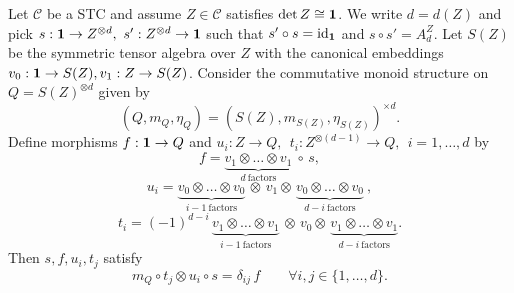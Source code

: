 \documentclass[12pt]{article}
\theoremstyle{definition}
\theoremstyle{definition}
\theoremstyle{remark}
\def\2#1{{\mathcal #1}}
\def\1#1{{\bf #1}}
\newcommand{\mcirc}{\circ}
\newcommand{\rarr}{\rightarrow}
\def\id{\mathrm{id}}
\begin{document}
\blemma \label{lem-det}
Let $\2C$ be a STC and assume $Z\in\2C$ satisfies $\det Z\cong\11$. We write $d=d(Z)$ and pick 
$s: \11\rarr Z^{\otimes d},\ s': Z^{\otimes d}\rarr\11$ such that $s'\circ s=\id_\11$ and
$s\circ s'=A_d^Z$. Let $S(Z)$ be the symmetric tensor algebra over $Z$ with the canonical 
embeddings $v_0:\11\rarr S(Z), v_1: Z\rarr S(Z)$.   
Consider the commutative monoid structure on $Q=S(Z)^{\otimes d}$ given by 
\[ (Q,m_Q,\eta_Q) = (S(Z),m_{S(Z)},\eta_{S(Z)})^{\times d}. \]
Define morphisms $f: \11\rarr Q$ and 
$u_i: Z\rarr Q,\ \ t_i: Z^{\otimes (d-1)}\rarr Q,\ \ i=1,\ldots,d$ by
\[ f= \underbrace{v_1\otimes \ldots\otimes v_1}_{d\ {\scriptstyle\mbox{factors}}}\ \circ\,s, \]
\[ u_i=\underbrace{v_0\otimes\ldots\otimes v_0}_{i-1\ {\scriptstyle \mbox{factors}}}\,\otimes\, v_1
   \otimes\,\underbrace{v_0\otimes\ldots\otimes v_0}_{d-i\ {\scriptstyle \mbox{factors}}}\ ,
\]
\[ t_i= (-1)^{d-i}\, \underbrace{v_1\otimes\ldots\otimes v_1}_{i-1\ {\scriptstyle \mbox{factors}}}  
  \,\otimes\, v_0 \otimes\,\underbrace{v_1\otimes\ldots\otimes v_1}_{d-i\ 
   {\scriptstyle \mbox{factors}}}. 
\]
Then $s,f,u_i,t_j$ satisfy
\begin{equation} \label{e-tu}
   m_Q\mcirc t_j\otimes u_i\mcirc s=\delta_{ij}\,f \quad\quad\forall i,j\in\{1,\ldots,d\}.
\end{equation}
\elemma
\end{document}
